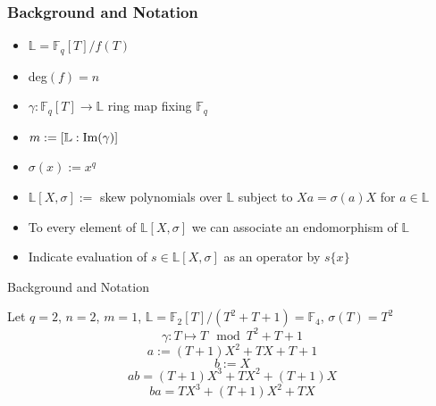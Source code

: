\documentclass{beamer}
\newcommand{\f}{\mathbb{F}}
\begin{document}
\begin{frame}
\frametitle{Background and Notation}

\begin{itemize}

\item $\mathbb{L} = \mathbb{F}_q[T]/f(T)$
\item deg$(f) = n$
\item $\gamma: \mathbb{F}_q[T] \to \mathbb{L}$ ring map fixing $\mathbb{F}_q$
\item $m := [\mathbb{L} : \textnormal{Im}(\gamma)]$
\item $\sigma(x) := x^q$
\item $\mathbb{L}[X,\sigma] := $ skew polynomials over $\mathbb{L}$ subject to $Xa = \sigma(a)X$ for $a \in \mathbb{L}$ 
\item To every element of $\mathbb{L}[X,\sigma]$ we can associate an endomorphism of $\mathbb{L}$
\item Indicate evaluation of $s \in \mathbb{L}[X,\sigma]$ as an operator by $s\{ x \}$

\end{itemize}
\end{frame}
\begin{frame}{Background and Notation}


\begin{example}
Let $q = 2$, $n=2$, $m = 1$, $\mathbb{L} = \mathbb{F}_2[T]/(T^2 + T + 1) = \mathbb{F}_4$, $\sigma(T) = T^2$
\[ \gamma : T \mapsto T \mod T^2 + T + 1\]
\[ a:= (T + 1)X^2 + TX + T + 1 \]
\[b := X\]
\[ab = (T + 1)X^3 + TX^2 + (T + 1)X\]
\[ba = TX^3 + (T+1)X^2 + TX \]
\end{example}



\end{frame}





\end{document}
